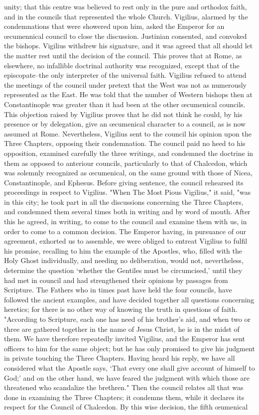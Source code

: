 unity; that this centre was believed to rest only in the pure and orthodox faith, and in the councils that represented the whole Church. Vigilius, alarmed by the condemnations that were showered upon him, asked the Emperor for an œcumennical council to close the discussion. Justinian consented, and convoked the bishops. Vigilius withdrew his signature, and it was agreed that all should let the matter rest until the decision of the council. This proves that at Rome, as elsewhere, no infallible doctrinal authority was recognized, except that of the episcopate--the only interpreter of the universal faith. Vigilius refused to attend the meetings of the council under pretext that the West was not as numerously represented as the East. He was told that the number of Western bishops then at Constantinople was greater than it had been at the other œcumenical councils. This objection raised by Vigilius proves that he did not think he could, by his presence or by delegation, give an œcumenical character to a council, as is now assumed at Rome. Nevertheless, Vigilius sent to the council his opinion upon the Three Chapters, opposing their condemnation. The council paid no heed to his opposition, examined carefully the three writings, and condemned the doctrine in them as opposed to anteriour councils, particularly to that of Chalcedon, which was solemnly recognized as œcumenical, on the same ground with those of Nicea, Constantinople, and Ephesus. Before giving sentence, the council rehearsed its proceedings in respect to Vigilius. "When The Most Pious Vigilius," it said, "was in this city; he took part in all the discussions concerning the Three Chapters, and condemned them several times both in writing and by word of mouth. After this he agreed, in writing, to come to the council and examine them with us, in order to come to a common decision. The Emperor having, in pursuance of our agreement, exhorted us to assemble, we were obliged to entreat Vigilius to fulfil his promise, recalling to him the example of the Apostles, who, filled with the Holy Ghost individually, and needing no deliberation, would not, nevertheless, determine the question ‘whether the Gentiles must be circumcised,' until they had met in council and had strengthened their opinions by passages from Scripture. The Fathers who in times past have held the four councils, have followed the ancient examples, and have decided together all questions concerning heretics; for there is no other way of knowing the truth in questions of faith. "According to Scripture, each one has need of his brother’s aid, and when two or three are gathered together in the name of Jesus Christ, he is in the midst of them. We have therefore repeatedly invited Vigilius, and the Emperor has sent officers to him for the same object; but he has only promised to give his judgment in private touching the Three Chapters. Having heard his reply, we have all considered what the Apostle says, ‘That every one shall give account of himself to God;' and on the other hand, we have feared the judgment with which those are threatened who scandalize the brethren." Then the council relates all that was done in examining the Three Chapters; it condemns them, while it declares its respect for the Council of Chalcedon. By this wise decision, the fifth œumenical 